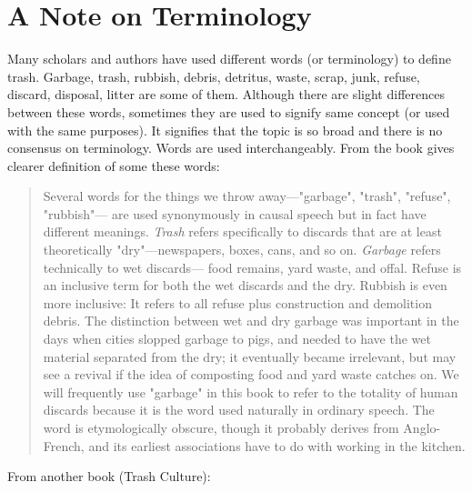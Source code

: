 %
\section{A Note on Terminology}
Many scholars and authors have used different words (or terminology) to define trash. Garbage, trash, rubbish, debris, detritus, waste, scrap, junk, refuse, discard, disposal, litter are some of them. Although there are slight differences between these words, sometimes they are used to signify same concept (or used with the same purposes). It signifies that the topic is so broad and there is no consensus on terminology. Words are used interchangeably. From the book  gives clearer definition of some these words:

\begin{quote}
Several words for the things we throw away---"garbage", "trash", "refuse", "rubbish"--- are used synonymously in causal speech but in fact have different meanings. \textit{Trash} refers specifically to discards that are at least theoretically "dry"---newspapers, boxes, cans, and so on. \textit{Garbage} refers technically to wet discards--- food remains, yard waste, and offal. Refuse is an inclusive term for both the wet discards and the dry. Rubbish is even more inclusive: It refers to all refuse plus construction and demolition debris. The distinction between wet and dry garbage was important in the days when cities slopped garbage to pigs, and needed to have the wet material separated from the dry; it eventually became irrelevant, but may see a revival if the idea of composting food and yard waste catches on. We will frequently use "garbage" in this book to refer to the totality of human discards because it is the word used naturally in ordinary speech. The word is etymologically obscure, though it probably derives from Anglo-French, and its earliest associations have to do with working in the kitchen.
\end{quote}

From another book (Trash Culture):

